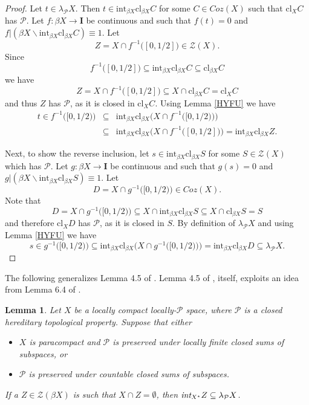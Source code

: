 \documentclass{amsart}
\newtheorem{lemma}[theorem]{Lemma}
\theoremstyle{definition}
\theoremstyle{remark}
\theoremstyle{notation}
\numberwithin{equation}{section}
\begin{document}
\begin{proof}
Let $t\in \lambda_{{\mathcal P}} X$. Then $t\in \mbox{int}_{\beta X} \mbox{cl}_{\beta X}C$ for some  $C\in Coz(X)$ such that $\mbox{cl}_X C$ has
${\mathcal P}$. Let $f:\beta X\rightarrow{\mathbf I}$ be continuous and such that $f(t)=0$ and
$f|(\beta X\backslash\mbox{int}_{\beta X} \mbox{cl}_{\beta X}C)\equiv 1$. Let
\[Z=X\cap f^{-1}\big([0,1/2]\big)\in {\mathscr Z}(X).\]
Since
\[f^{-1}\big([0,1/2]\big)\subseteq\mbox{int}_{\beta X} \mbox{cl}_{\beta X}C\subseteq \mbox{cl}_{\beta X}C\]
we have
\[Z=X\cap f^{-1}\big([0,1/2]\big)\subseteq X \cap\mbox{cl}_{\beta X}C=\mbox{cl}_X C\]
and thus $Z$ has  $\mathcal{P}$, as it is closed in $\mbox{cl}_X C$.  Using Lemma \ref{HYFU} we have
\begin{eqnarray*}
t\in f^{-1}\big([0,1/2)\big)&\subseteq&\mbox{int}_{\beta X}\mbox{cl}_{\beta X}\big(X\cap f^{-1}\big([0,1/2)\big)\big)\\&\subseteq&\mbox{int}_{\beta X}\mbox{cl}_{\beta X}\big(X\cap f^{-1}\big([0,1/2]\big)\big)=\mbox{int}_{\beta X}\mbox{cl}_{\beta X}Z.
\end{eqnarray*}

Next, to show the reverse inclusion, let  $s\in \mbox{int}_{\beta X}\mbox{cl}_{\beta X}S$ for some $S\in {\mathscr Z}(X)$ which has  $\mathcal{P}$. Let
$g:\beta X\rightarrow{\mathbf I}$ be continuous and such that $g(s)=0$ and $g|(\beta X\backslash\mbox{int}_{\beta X} \mbox{cl}_{\beta X}S)\equiv 1$.
Let
\[D=X\cap g^{-1}\big([0,1/2)\big)\in Coz(X).\]
Note that
\[D=X\cap g^{-1}\big([0,1/2)\big)\subseteq X\cap\mbox{int}_{\beta X}\mbox{cl}_{\beta X}S\subseteq X\cap\mbox{cl}_{\beta X}S=S\]
and therefore $\mbox{cl}_X D$ has  $\mathcal{P}$, as it is closed in $S$. By definition of
$\lambda_{{\mathcal P}} X$ and using Lemma \ref{HYFU} we have
\[s\in g^{-1}\big([0,1/2)\big)\subseteq\mbox{int}_{\beta X}\mbox{cl}_{\beta X}\big(X\cap g^{-1}\big([0,1/2)\big)\big)=\mbox{int}_{\beta X}\mbox{cl}_{\beta X}D\subseteq\lambda_{{\mathcal P}} X.\]
\end{proof}

The following generalizes  Lemma 4.5 of \cite{Ko2}.  Lemma 4.5 of \cite{Ko2}, itself, exploits  an idea from Lemma 6.4 of \cite{HJW}.

\begin{lemma}\label{JDSB}
Let $X$ be a locally compact locally-${\mathcal P}$ space, where ${\mathcal P}$ is a  closed hereditary topological property. Suppose that either
\begin{itemize}
\item[\rm(1)] $X$ is paracompact and ${\mathcal P}$ is preserved under locally finite closed sums of subspaces, or
\item[\rm(2)] ${\mathcal P}$ is preserved under countable closed sums of subspaces.
\end{itemize}
If a $Z\in {\mathscr Z}(\beta X)$ is such that $X\cap Z=\emptyset$, then $\mbox{\em int}_{X^\star}Z\subseteq \lambda_{{\mathcal P}} X$.
\end{lemma}
\end{document}
